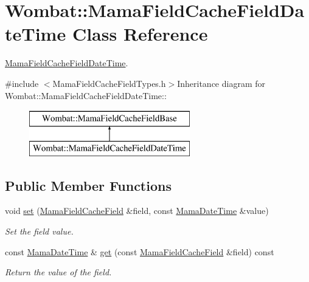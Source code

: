 \hypertarget{classWombat_1_1MamaFieldCacheFieldDateTime}{
\section{Wombat::MamaFieldCacheFieldDateTime Class Reference}
\label{classWombat_1_1MamaFieldCacheFieldDateTime}
}


\hyperlink{classWombat_1_1MamaFieldCacheFieldDateTime}{MamaFieldCacheFieldDateTime}.  


{\ttfamily \#include $<$MamaFieldCacheFieldTypes.h$>$}Inheritance diagram for Wombat::MamaFieldCacheFieldDateTime::\begin{figure}[H]
\begin{center}
\leavevmode
\includegraphics[height=2cm]{classWombat_1_1MamaFieldCacheFieldDateTime}
\end{center}
\end{figure}
\subsection*{Public Member Functions}
\begin{DoxyCompactItemize}
\item 
void \hyperlink{classWombat_1_1MamaFieldCacheFieldDateTime_a14293e67872bbbb17d43cef3c3380979}{set} (\hyperlink{classWombat_1_1MamaFieldCacheField}{MamaFieldCacheField} \&field, const \hyperlink{classWombat_1_1MamaDateTime}{MamaDateTime} \&value)
\begin{DoxyCompactList}\small\item\em Set the field value. \item\end{DoxyCompactList}\item 
const \hyperlink{classWombat_1_1MamaDateTime}{MamaDateTime} \& \hyperlink{classWombat_1_1MamaFieldCacheFieldDateTime_ae62028711522ac173015740165d8424b}{get} (const \hyperlink{classWombat_1_1MamaFieldCacheField}{MamaFieldCacheField} \&field) const 
\begin{DoxyCompactList}\small\item\em Return the value of the field. \item\end{DoxyCompactList}\end{DoxyCompactItemize}
